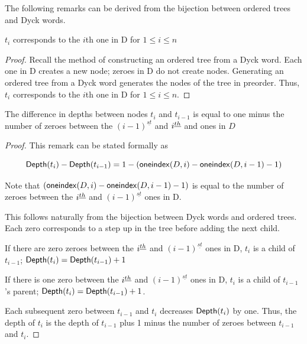 The following remarks can be derived from the bijection between ordered trees and Dyck words.


\begin{remark}
    $t_i$ corresponds to the $i$th one in D for $1 \le i \le n$
\end{remark}
\begin{proof}
    Recall the method of constructing an ordered tree from a Dyck word.  Each one in D creates a new node; zeroes in D do not create nodes.  Generating an ordered tree from a Dyck word generates the nodes of the tree in preorder.  Thus, $t_i$ corresponds to the $i$th one in D for $1 \le i \le n$.
\end{proof}

\begin{remark} The difference in depths between nodes $t_i$ and $t_{i-1}$ is equal to one minus the number of zeroes between the $(i-1)^{\underline{st}}$ and $i^{\underline{th}}$ and  ones in $D$


\end{remark}
\begin{proof}

    This remark can be stated formally as 

    \begin{equation} \label{eq:depthformula} 
    	\mathsf{Depth}{(t_i)} - \mathsf{Depth}{(t_{i-1})}=1-(\mathsf{oneindex}({D}, i)-\mathsf{oneindex}({D}, i-1) - 1) 
    \end{equation}
    


    

    Note that $(\mathsf{oneindex}({D}, i)-\mathsf{oneindex}({D}, i-1)-1)$ is equal to the number of zeroes between the $i^{\underline{th}}$ and $(i-1)^{\underline{st}}$ ones in D.  %



    This follows naturally from the bijection between Dyck words and ordered trees.  Each zero corresponds to a step up in the tree before adding the next child.  

    If there are zero zeroes between the $i^{\underline{th}}$  and $(i-1)^{\underline{st}}$ ones in D, $t_i$ is a child of $t_{i-1}$; $\mathsf{Depth}{(t_i)}=\mathsf{Depth}{(t_{i-1})}+1$

    If there is one zero between the $i^{\underline{th}}$  and $(i-1)^{\underline{st}}$ ones in D, $t_i$ is a child of $t_{i-1}$'s parent; $\mathsf{Depth}{(t_i)}=\mathsf{Depth}{(t_{i-1})}+1$.  

    Each subsequent zero between $t_{i-1}$ and $t_i$ decreases $\mathsf{Depth}{(t_{i})}$ by one.  Thus, the depth of $t_i$ is the depth of $t_{i-1}$ plus 1 minus the number of zeroes between $t_{i-1}$ and $t_{i}$.
\end{proof}


